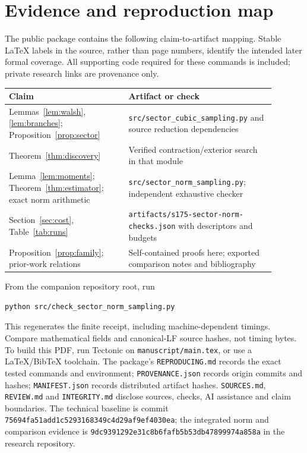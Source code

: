 \documentclass[11pt]{article}
\begin{document}
\section{Evidence and reproduction map}\label{app:reproduce}
The public package contains the following claim-to-artifact mapping. Stable LaTeX
labels in the source, rather than page numbers, identify the intended later formal
coverage. All supporting code required for these commands is included; private
research links are provenance only.
\begin{center}\small
\begin{tabular}{p{0.40\linewidth}p{0.49\linewidth}}
\toprule
Claim & Artifact or check\\\midrule
Lemmas~\ref{lem:walsh},\ref{lem:branches}; Proposition~\ref{prop:sector}
& \texttt{src/sector\_cubic\_sampling.py} and source reduction dependencies\\
Theorem~\ref{thm:discovery}
& Verified contraction/exterior search in that module\\
Lemma~\ref{lem:moments}; Theorem~\ref{thm:estimator}; exact norm arithmetic
& \texttt{src/sector\_norm\_sampling.py}; independent exhaustive checker\\
Section~\ref{sec:cost}, Table~\ref{tab:runs}
& \texttt{artifacts/s175-sector-norm-checks.json} with descriptors and budgets\\
Proposition~\ref{prop:family}; prior-work relations
& Self-contained proofs here; exported comparison notes and bibliography\\
\bottomrule
\end{tabular}
\end{center}
From the companion repository root, run
\begin{verbatim}
python src/check_sector_norm_sampling.py
\end{verbatim}
This regenerates the finite receipt, including machine-dependent timings. Compare
mathematical fields and canonical-LF source hashes, not timing bytes. To build this
PDF, run Tectonic on \texttt{manuscript/main.tex}, or use a LaTeX/BibTeX toolchain.
The package's \texttt{REPRODUCING.md} records the exact tested commands and environment;
\texttt{PROVENANCE.json} records origin commits and hashes; \texttt{MANIFEST.json}
records distributed artifact hashes. \texttt{SOURCES.md}, \texttt{REVIEW.md} and
\texttt{INTEGRITY.md} disclose sources, checks, AI assistance and claim boundaries.
The technical baseline is commit \texttt{75694fa51add1c5293168349c4d29af9ef4030ea};
the integrated norm and comparison evidence is
\texttt{9dc9391292e31c8b6fafb5b53db47899974a858a} in the research repository.



\end{document}
